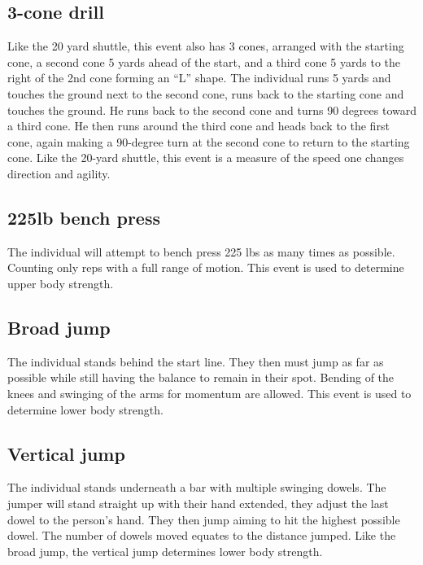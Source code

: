 \documentclass[confrence]{IEEEtran}
\begin{document}
\subsection*{3-cone drill}
Like the 20 yard shuttle, this event also has 3 cones, arranged with the starting cone, a second cone 5 yards ahead of the start, and a third cone 5 yards to the right of the 2nd cone forming an “L” shape. 
The individual runs 5 yards and touches the ground next to the second cone, runs back to the starting cone and touches the ground. 
He runs back to the second cone and turns 90 degrees toward a third cone. 
He then runs around the third cone and heads back to the first cone, again making a 90-degree turn at the second cone to return to the starting cone. 
Like the 20-yard shuttle, this event is a measure of the speed one changes direction and agility.
\subsection*{225lb bench press}
The individual will attempt to bench press 225 lbs as many times as possible. 
Counting only reps with a full range of motion.
This event is used to determine upper body strength. 
\subsection*{Broad jump}
The individual stands behind the start line. 
They then must jump as far as possible while still having the balance to remain in their spot.
Bending of the knees and swinging of the arms for momentum are allowed.
This event is used to determine lower body strength.
\subsection*{Vertical jump}
The individual stands underneath a bar with multiple swinging dowels. 
The jumper will stand straight up with their hand extended, they adjust the last dowel to the person's hand.
They then jump aiming to hit the highest possible dowel. 
The number of dowels moved equates to the distance jumped.
Like the broad jump, the vertical jump determines lower body strength.
\end{document}
